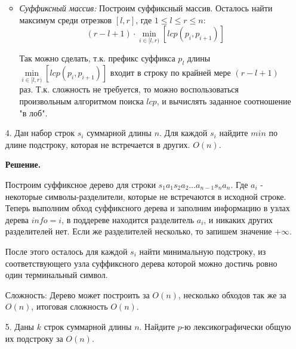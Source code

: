 \begin{enumerate}
\begin{itemize}
		\item \textit{Суффиксный массив:} Построим суффиксный массив. Осталось найти максимум среди отрезков $[l, 
		r]$, где $1 \leq l \leq r \leq n$:
		\begin{equation*}
			(r - l + 1) \cdot \min \limits_{i \in [l, r)} \left[ lcp(p_i, p_{i + 1}) \right]
		\end{equation*}
		
		Так можно сделать, т.к. префикс суффикса $p_l$ длины $\min \limits_{i \in [l, r)} \left[ lcp(p_i, p_{i + 
		1}) \right]$ входит в строку по крайней мере $(r - l + 1)$ раз. Т.к. сложность не требуется, то можно 
		воспользоваться произвольным алгоритмом поиска $lcp$, и вычислять заданное соотношение "в лоб".
		
	\end{itemize}
	\item[4.] Дан набор строк $s_i$ суммарной длины $n$. Для каждой $s_i$ найдите $min$ по длине подстроку, которая не встречается в других. $O(n)$.
	
	\textbf{Решение.} 
	
	Построим суффиксное дерево для строки $s_1a_1s_2a_2\dots a_{n - 1}s_na_n$. Где $a_i$ - некоторые 
	символы-разделители, которые не встречаются в исходной строке. Теперь выполним обход суффиксного дерева и 
	заполним информацию в узлах дерева $info = i$, в поддереве находится разделитель $a_i$, и никаких других 
	разделителей нет. Если же разделителей несколько, то запишем значение $+\infty$. 
	
	После этого осталось для каждой $s_i$ найти минимальную подстроку, из соответствующего узла суффиксного 
	дерева которой можно достичь ровно один терминальный символ.
	
	Сложность: Дерево может построить за $O(n)$, несколько обходов так же за $O(n)$, итоговая сложность $O(n)$.
	
	\item[5.] Даны $k$ строк суммарной длины $n$. Найдите $p$-ю лексикографически общую их подстроку за $O(n)$.
\end{enumerate}
